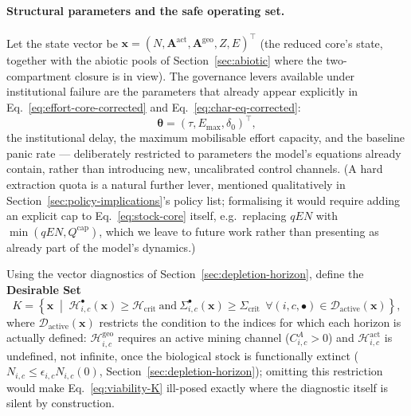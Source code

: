 \documentclass[twocolumn,10pt]{article}
\begin{document}
\paragraph{Structural parameters and the safe operating set.} Let the state vector be $\mathbf x=(N,\mathbf A^{\text{act}},\mathbf A^{\text{geo}},Z,E)^\top$ (the reduced core's state, together with the abiotic pools of Section~\ref{sec:abiotic} where the two-compartment closure is in view). The governance levers available under institutional failure are the parameters that already appear explicitly in Eq.~\eqref{eq:effort-core-corrected} and Eq.~\eqref{eq:char-eq-corrected}:
\begin{equation}
\boldsymbol\theta = (\tau, E_{\max}, \delta_0)^\top,
\label{eq:viability-theta}
\end{equation}
the institutional delay, the maximum mobilisable effort capacity, and the baseline panic rate — deliberately restricted to parameters the model's equations already contain, rather than introducing new, uncalibrated control channels. (A hard extraction quota is a natural further lever, mentioned qualitatively in Section~\ref{sec:policy-implications}'s policy list; formalising it would require adding an explicit cap to Eq.~\eqref{eq:stock-core} itself, e.g.\ replacing $qEN$ with $\min(qEN,Q^{\text{cap}})$, which we leave to future work rather than presenting as already part of the model's dynamics.)

Using the vector diagnostics of Section~\ref{sec:depletion-horizon}, define the \textbf{Desirable Set}
\begin{equation}
K = \left\{ \mathbf x \;\middle|\; \mathcal H^{\bullet}_{i,c}(\mathbf x) \ge \mathcal H_{\text{crit}} \ \text{and}\ \Sigma^{\bullet}_{i,c}(\mathbf x) \ge \Sigma_{\text{crit}} \ \ \forall (i,c,\bullet)\in\mathcal D_{\text{active}}(\mathbf x) \right\},
\label{eq:viability-K}
\end{equation}
where $\mathcal D_{\text{active}}(\mathbf x)$ restricts the condition to the indices for which each horizon is actually defined: $\mathcal H^{\text{geo}}_{i,c}$ requires an active mining channel ($C^A_{i,c}>0$) and $\mathcal H^{\text{act}}_{i,c}$ is undefined, not infinite, once the biological stock is functionally extinct ($N_{i,c}\le\epsilon_{i,c}N_{i,c}(0)$, Section~\ref{sec:depletion-horizon}); omitting this restriction would make Eq.~\eqref{eq:viability-K} ill-posed exactly where the diagnostic itself is silent by construction.
\end{document}
